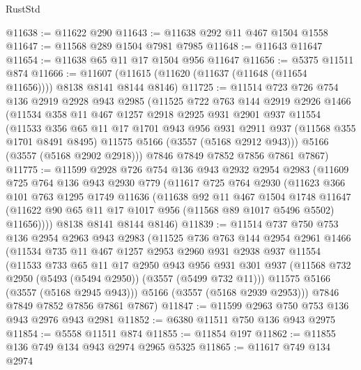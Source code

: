 \begin{lexlean}{RustStd}
\begin{coremodule}
@11638 := @11622 @290
@11643 := @11638 @292 @11 @467 @1504 @1558
@11647 := @11568 @289 @1504 @7981 @7985
@11648 := @11643 @11647
@11654 := @11638 @65 @11 @17 @1504 @956 @11647
@11656 := @5375 @11511 @874
@11666 := @11607 (@11615 (@11620 (@11637 (@11648 (@11654 @11656)))) @8138 @8141 @8144 @8146)
@11725 := @11514
    @723
    @726
    @754
    @136
    @2919
    @2928
    @943
    @2985
    (@11525
      @722
      @763
      @144
      @2919
      @2926
      @1466
      (@11534
        @358
        @11
        @467
        @1257
        @2918
        @2925
        @931
        @2901
        @937
        @11554
        (@11533
          @356
          @65
          @11
          @17
          @1701
          @943
          @956
          @931
          @2911
          @937
          (@11568 @355 @1701 @8491 @8495)
          @11575
          @5166
          (@3557 (@5168 @2912 @943)))
        @5166
        (@3557 (@5168 @2902 @2918)))
      @7846
      @7849
      @7852
      @7856
      @7861
      @7867)
@11775 := @11599
    @2928
    @726
    @754
    @136
    @943
    @2932
    @2954
    @2983
    (@11609
      @725
      @764
      @136
      @943
      @2930
      @779
      (@11617
        @725
        @764
        @2930
        (@11623
          @366
          @101
          @763
          @1295
          @1749
          @11636
          (@11638
            @92
            @11
            @467
            @1504
            @1748
            @11647
            (@11622 @90 @65 @11 @17 @1017 @956 (@11568 @89 @1017 @5496 @5502) @11656))))
      @8138
      @8141
      @8144
      @8146)
@11839 := @11514
    @737
    @750
    @753
    @136
    @2954
    @2963
    @943
    @2983
    (@11525
      @736
      @763
      @144
      @2954
      @2961
      @1466
      (@11534
        @735
        @11
        @467
        @1257
        @2953
        @2960
        @931
        @2938
        @937
        @11554
        (@11533
          @733
          @65
          @11
          @17
          @2950
          @943
          @956
          @931
          @301
          @937
          (@11568 @732 @2950 (@5493 (@5494 @2950)) (@3557 (@5499 @732 @11)))
          @11575
          @5166
          (@3557 (@5168 @2945 @943)))
        @5166
        (@3557 (@5168 @2939 @2953)))
      @7846
      @7849
      @7852
      @7856
      @7861
      @7867)
@11847 := @11599 @2963 @750 @753 @136 @943 @2976 @943 @2981
@11852 := @6380 @11511 @750 @136 @943 @2975
@11854 := @5558 @11511 @874
@11855 := @11854 @197
@11862 := @11855 @136 @749 @134 @943 @2974 @2965 @5325
@11865 := @11617 @749 @134 @2974

\end{coremodule}
\end{lexlean}
